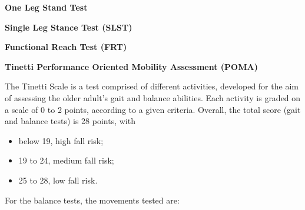 \vspace{0.3cm}
\textbf{One Leg Stand Test}

\vspace{0.3cm}
\textbf{Single Leg Stance Test (SLST)}

\vspace{0.3cm}
\textbf{Functional Reach Test (FRT)}

\vspace{0.3cm}
\textbf{Tinetti Performance Oriented Mobility Assessment (POMA)}

The Tinetti Scale is a test comprised of different activities, developed for the aim of assessing the older adult’s gait and balance abilities. Each activity is graded on a scale of 0 to 2 points, according to a given criteria. Overall, the total score (gait and balance tests) is 28 points, with 
\begin{itemize}
    \item below 19, high fall risk;
    \item 19 to 24, medium fall risk;
    \item 25 to 28, low fall risk.
\end{itemize}
For the balance tests, the movements tested are:













